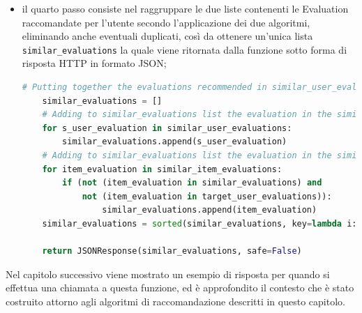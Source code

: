 \begin{itemize}
\begin{lstlisting}[language=Python, label=lst:CF_Hybrid_Evaluation_4]
            # Taking only the evaluations that have: different other_id (excluding the target evaluation
            # in the recommendation) and same parent_id and the evaluations that weren't added to 'similar_item_evaluations'
            # list or to 'similar_user_evaluations' or to 'target_user_evaluations'
            if ((t_user_evaluation['other_id'] != item_evaluation['other_id']) and 
                (t_user_evaluation['parent_id'] == item_evaluation['parent_id']) and 
                not (item_evaluation in similar_item_evaluations) and 
                not (item_evaluation in similar_user_evaluations) and 
                not (item_evaluation in target_user_evaluations)): 
                    similar_item_evaluations.append(item_evaluation)
    \end{lstlisting} 
    \item il quarto passo consiste nel raggruppare le due liste contenenti le Evaluation raccomandate per l'utente secondo l'applicazione dei 
    due algoritmi, eliminando anche eventuali duplicati, così da ottenere un'unica lista \texttt{similar\_evaluations} la quale viene ritornata dalla 
    funzione sotto forma di risposta HTTP in formato JSON;
    \begin{lstlisting}[language=Python, label=lst:CF_Hybrid_Evaluation_5]
    # Putting together the evaluations recommended in similar_user_evaluations list and similar_item_evaluations list
    similar_evaluations = []
    # Adding to similar_evaluations list the evaluation in the similar_user_evaluations list
    for s_user_evaluation in similar_user_evaluations:
        similar_evaluations.append(s_user_evaluation)
    # Adding to similar_evaluations list the evaluation in the similar_item_evaluations list
    for item_evaluation in similar_item_evaluations:
        if (not (item_evaluation in similar_evaluations) and
            not (item_evaluation in target_user_evaluations)):
                similar_evaluations.append(item_evaluation)
    similar_evaluations = sorted(similar_evaluations, key=lambda i: i['other_id'])
    
    return JSONResponse(similar_evaluations, safe=False)
    \end{lstlisting} 
\end{itemize}
Nel capitolo successivo viene mostrato un esempio di risposta per quando si effettua una chiamata a questa funzione, ed è approfondito il contesto che 
è stato costruito attorno agli algoritmi di raccomandazione descritti in questo capitolo.
